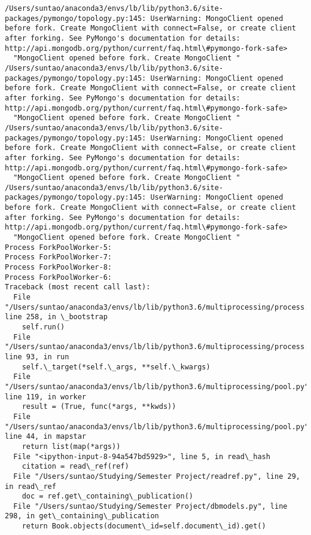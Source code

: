 \documentclass[11pt]{article}
\begin{document}
    \begin{Verbatim}[commandchars=\\\{\}]
/Users/suntao/anaconda3/envs/lb/lib/python3.6/site-packages/pymongo/topology.py:145: UserWarning: MongoClient opened before fork. Create MongoClient with connect=False, or create client after forking. See PyMongo's documentation for details: http://api.mongodb.org/python/current/faq.html\#pymongo-fork-safe>
  "MongoClient opened before fork. Create MongoClient "
/Users/suntao/anaconda3/envs/lb/lib/python3.6/site-packages/pymongo/topology.py:145: UserWarning: MongoClient opened before fork. Create MongoClient with connect=False, or create client after forking. See PyMongo's documentation for details: http://api.mongodb.org/python/current/faq.html\#pymongo-fork-safe>
  "MongoClient opened before fork. Create MongoClient "
/Users/suntao/anaconda3/envs/lb/lib/python3.6/site-packages/pymongo/topology.py:145: UserWarning: MongoClient opened before fork. Create MongoClient with connect=False, or create client after forking. See PyMongo's documentation for details: http://api.mongodb.org/python/current/faq.html\#pymongo-fork-safe>
  "MongoClient opened before fork. Create MongoClient "
/Users/suntao/anaconda3/envs/lb/lib/python3.6/site-packages/pymongo/topology.py:145: UserWarning: MongoClient opened before fork. Create MongoClient with connect=False, or create client after forking. See PyMongo's documentation for details: http://api.mongodb.org/python/current/faq.html\#pymongo-fork-safe>
  "MongoClient opened before fork. Create MongoClient "
Process ForkPoolWorker-5:
Process ForkPoolWorker-7:
Process ForkPoolWorker-8:
Process ForkPoolWorker-6:
Traceback (most recent call last):
  File "/Users/suntao/anaconda3/envs/lb/lib/python3.6/multiprocessing/process.py", line 258, in \_bootstrap
    self.run()
  File "/Users/suntao/anaconda3/envs/lb/lib/python3.6/multiprocessing/process.py", line 93, in run
    self.\_target(*self.\_args, **self.\_kwargs)
  File "/Users/suntao/anaconda3/envs/lb/lib/python3.6/multiprocessing/pool.py", line 119, in worker
    result = (True, func(*args, **kwds))
  File "/Users/suntao/anaconda3/envs/lb/lib/python3.6/multiprocessing/pool.py", line 44, in mapstar
    return list(map(*args))
  File "<ipython-input-8-94a547bd5929>", line 5, in read\_hash
    citation = read\_ref(ref)
  File "/Users/suntao/Studying/Semester Project/readref.py", line 29, in read\_ref
    doc = ref.get\_containing\_publication()
  File "/Users/suntao/Studying/Semester Project/dbmodels.py", line 298, in get\_containing\_publication
    return Book.objects(document\_id=self.document\_id).get()

\end{Verbatim}
\end{document}
